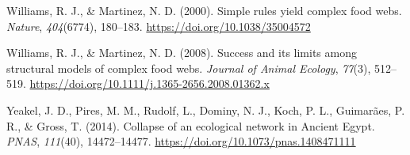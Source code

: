 \documentclass[
]{article}
\newlength{\cslhangindent}
\newenvironment{CSLReferences}[2] %
 {\begin{list}{}{%
  \setlength{\itemindent}{0pt}
  \setlength{\leftmargin}{0pt}
  \setlength{\parsep}{0pt}
  \ifodd #1
   \setlength{\leftmargin}{\cslhangindent}
   \setlength{\itemindent}{-1\cslhangindent}
  \fi
  \setlength{\itemsep}{#2\baselineskip}}}
 {\end{list}}
\begin{document}
\begin{CSLReferences}{1}{0}
Williams, R. J., \& Martinez, N. D. (2000). Simple rules yield complex
food webs. \emph{Nature}, \emph{404}(6774), 180--183.
\url{https://doi.org/10.1038/35004572}

Williams, R. J., \& Martinez, N. D. (2008). Success and its limits among
structural models of complex food webs. \emph{Journal of Animal
Ecology}, \emph{77}(3), 512--519.
\url{https://doi.org/10.1111/j.1365-2656.2008.01362.x}

Yeakel, J. D., Pires, M. M., Rudolf, L., Dominy, N. J., Koch, P. L.,
Guimarães, P. R., \& Gross, T. (2014). Collapse of an ecological network
in {Ancient Egypt}. \emph{PNAS}, \emph{111}(40), 14472--14477.
\url{https://doi.org/10.1073/pnas.1408471111}

\end{CSLReferences}
\end{document}
